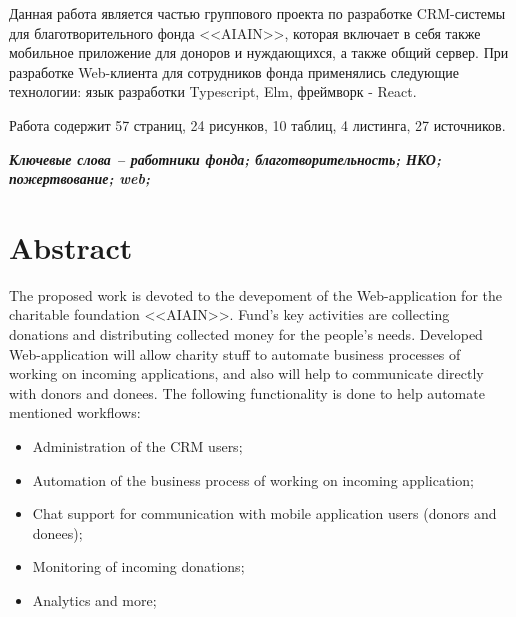 \documentclass[a4paper,12pt,reqno]{article}
\begin{document}
Данная работа является частью группового проекта по разработке CRM-системы для благотворительного фонда <<AIAIN>>, которая включает в себя также мобильное приложение для доноров и нуждающихся, а также общий сервер. При разработке Web-клиента для сотрудников фонда применялись следующие технологии: язык разработки Typescript, Elm, фреймворк - React. 




Работа содержит 57 страниц, 24 рисунков, 10 таблиц, 4 листинга, 27 источников.

\textit{\textbf{Ключевые слова -- работники фонда; благотворительность; НКО; пожертвование; web;}}

\newpage

\section*{Abstract}



The proposed work is devoted to the devepoment of the Web-application for the charitable foundation <<AIAIN>>. Fund's key activities are collecting donations and distributing collected money for the people's needs. Developed Web-application will allow charity stuff to automate business processes of working on incoming applications, and also will help to communicate directly with donors and donees. The following functionality is done to help automate mentioned workflows:
\begin{itemize}
    \item Administration of the CRM users;
    \item Automation of the business process of working on incoming application;
    \item Chat support for communication with mobile application users (donors and donees); 
    \item Monitoring of incoming donations; 
    \item Analytics and more;
\end{itemize}
\end{document}
